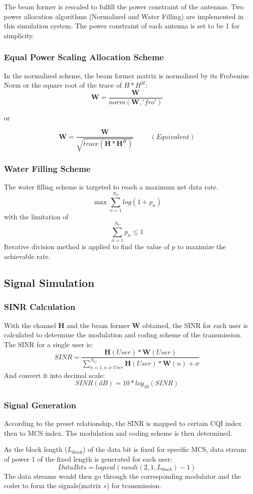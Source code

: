 \documentclass{article}
\begin{document}
The beam former is rescaled to fulfill the power constraint of the antennas. Two power allocation algorithms (Normalized and Water Filling) are implemented in this simulation system. The power constraint of each antenna is set to be 1 for simplicity.
\subsubsection{Equal Power Scaling Allocation Scheme}
In the normalized scheme, the beam former matrix is normalized by its Frobenius Norm or the square root of the trace of $H*H^H$:
$$
\textbf{W} = \frac{\textbf{W}}{norm(\textbf{W}, 'fro')}
$$
\begin{center}or\end{center}
$$
\textbf{W} = \frac{\textbf{W}}{\sqrt{trace(\textbf{H}*\textbf{H}^H)}}   \hspace{1cm}(Equivalent)
$$
\subsubsection{Water Filling Scheme}
The water filling scheme is targeted to reach a maximum net data rate.
$$
\max \sum_{n=1}^{N_U} log(1+p_n)
$$
with the limitation of
$$\sum_{n=1}^{N_U} p_n \leq 1$$
Iterative division method is applied to find the value of $p$ to maximize the achievable rate.

\subsection{Signal Simulation}
\subsubsection{SINR Calculation}
With the channel \textbf{H} and the beam former \textbf{W} obtained, the SINR for each user is calculated to determine the modulation and coding scheme of the transmission.
The SINR for a single user is:
$$
SINR = \frac{\textbf{H}(User)*\textbf{W}(User)}{\sum_{n=1,n\ne User}^{N_U} \textbf{H}(User)*\textbf{W}(n)+\sigma}
$$
And convert it into decimal scale:
$$SINR(dB) = 10*log_10(SINR)$$
\subsubsection{Signal Generation}
According to the preset relationship, the SINR is mapped to certain CQI index then to MCS index.
The modulation and coding scheme is then determined. 

As the block length ($L_{block}$) of the data bit is fixed for specific MCS, data stream of power 1 of the fixed length is generated for each user:
$$DataBits = logical(randi(2,1,L_{block})-1)$$
The data streams would then go through the corresponding modulator and the coder to form the signals(matrix $s$) for transmission. 
\end{document}

